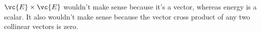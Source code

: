 $\vc{E}\times\vc{E}$ wouldn't make sense because it's a vector, whereas
energy is a scalar. It also wouldn't make sense because the vector cross
product of any two collinear vectors is zero.
